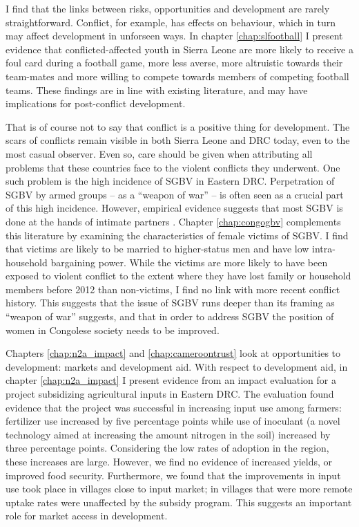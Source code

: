 I find that the links between risks, opportunities and development are rarely straightforward. Conflict, for example, has effects on behaviour, which in turn may affect development in unforseen ways. In chapter \ref{chap:slfootball} I present evidence that conflicted-affected youth in Sierra Leone are more likely to receive a foul card during a football game, more less averse,  more altruistic towards their team-mates and more willing to compete towards members of competing football teams. These findings are in line with existing literature, and may have implications for post-conflict development. 

That is of course not to say that conflict is a positive thing for development. The scars of conflicts remain visible in both Sierra Leone and DRC today, even to the most casual observer. Even so, care should be given when attributing all problems that these countries face to the violent conflicts they underwent. One such problem is the high incidence of SGBV in Eastern DRC. Perpetration of SGBV by armed groups -- as a ``weapon of war'' -- is often seen as a crucial part of this high incidence. However, empirical evidence suggests that most SGBV is done at the hands of intimate partners \citep[see e.g.][]{Peterman2011}. Chapter \ref{chap:congogbv} complements this literature by examining the characteristics of female victims of SGBV. I find that victims are likely to be married to higher-status men and have low intra-household bargaining power. While the victims are more likely to have been exposed to violent conflict to the extent where they have lost family or household members before 2012 than non-victims, I find no link with more recent conflict history. This suggests that the issue of SGBV runs deeper than its framing as ``weapon of war'' suggests, and that  in order to address SGBV the position of women in Congolese society needs to be improved.

Chapters \ref{chap:n2a_impact} and \ref{chap:cameroontrust} look at opportunities to development: markets and development aid. With respect to development aid, in chapter \ref{chap:n2a_impact} I present evidence from an impact evaluation for a project subsidizing agricultural inputs in Eastern DRC. The evaluation found evidence that the project was successful in increasing input use among farmers: fertilizer use increased by five percentage points while use of inoculant (a novel technology aimed at increasing the amount nitrogen in the soil) increased by three percentage points. Considering the low rates of adoption in the region, these increases are large. However, we find no evidence of increased yields, or improved food security. Furthermore, we found that the improvements in input use took place in villages close to input market; in villages that were more remote uptake rates were unaffected by the subsidy program. This suggests an important role for market access in development.

